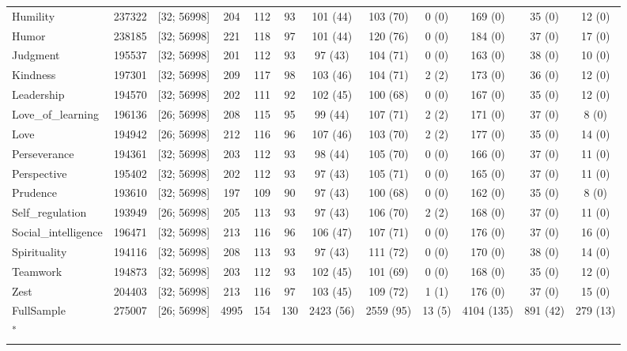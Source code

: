 \documentclass[
  man,floatsintext]{apa6}
\begin{document}
\begin{table}
{\begin{tabular}[t]{lccccccccccc}
Humility & 237322 & {}[32; 56998] & 204 & 112 & 93 & 101 (44) & 103 (70) & 0 (0) & 169 (0) & 35 (0) & 12 (0)\\
\addlinespace
Humor & 238185 & {}[32; 56998] & 221 & 118 & 97 & 101 (44) & 120 (76) & 0 (0) & 184 (0) & 37 (0) & 17 (0)\\
Judgment & 195537 & {}[32; 56998] & 201 & 112 & 93 & 97 (43) & 104 (71) & 0 (0) & 163 (0) & 38 (0) & 10 (0)\\
Kindness & 197301 & {}[32; 56998] & 209 & 117 & 98 & 103 (46) & 104 (71) & 2 (2) & 173 (0) & 36 (0) & 12 (0)\\
Leadership & 194570 & {}[32; 56998] & 202 & 111 & 92 & 102 (45) & 100 (68) & 0 (0) & 167 (0) & 35 (0) & 12 (0)\\
Love\_of\_learning & 196136 & {}[26; 56998] & 208 & 115 & 95 & 99 (44) & 107 (71) & 2 (2) & 171 (0) & 37 (0) & 8 (0)\\
\addlinespace
Love & 194942 & {}[26; 56998] & 212 & 116 & 96 & 107 (46) & 103 (70) & 2 (2) & 177 (0) & 35 (0) & 14 (0)\\
Perseverance & 194361 & {}[32; 56998] & 203 & 112 & 93 & 98 (44) & 105 (70) & 0 (0) & 166 (0) & 37 (0) & 11 (0)\\
Perspective & 195402 & {}[32; 56998] & 202 & 112 & 93 & 97 (43) & 105 (71) & 0 (0) & 165 (0) & 37 (0) & 11 (0)\\
Prudence & 193610 & {}[32; 56998] & 197 & 109 & 90 & 97 (43) & 100 (68) & 0 (0) & 162 (0) & 35 (0) & 8 (0)\\
Self\_regulation & 193949 & {}[26; 56998] & 205 & 113 & 93 & 97 (43) & 106 (70) & 2 (2) & 168 (0) & 37 (0) & 11 (0)\\
\addlinespace
Social\_intelligence & 196471 & {}[32; 56998] & 213 & 116 & 96 & 106 (47) & 107 (71) & 0 (0) & 176 (0) & 37 (0) & 16 (0)\\
Spirituality & 194116 & {}[32; 56998] & 208 & 113 & 93 & 97 (43) & 111 (72) & 0 (0) & 170 (0) & 38 (0) & 14 (0)\\
Teamwork & 194873 & {}[32; 56998] & 203 & 112 & 93 & 102 (45) & 101 (69) & 0 (0) & 168 (0) & 35 (0) & 12 (0)\\
Zest & 204403 & {}[32; 56998] & 213 & 116 & 97 & 103 (45) & 109 (72) & 1 (1) & 176 (0) & 37 (0) & 15 (0)\\
FullSample & 275007 & {}[26; 56998] & 4995 & 154 & 130 & 2423 (56) & 2559 (95) & 13 (5) & 4104 (135) & 891 (42) & 279 (13)\\
\bottomrule
\multicolumn{12}{l}{\textsuperscript{*} }\\
\end{tabular}}
\end{table}
\end{document}
